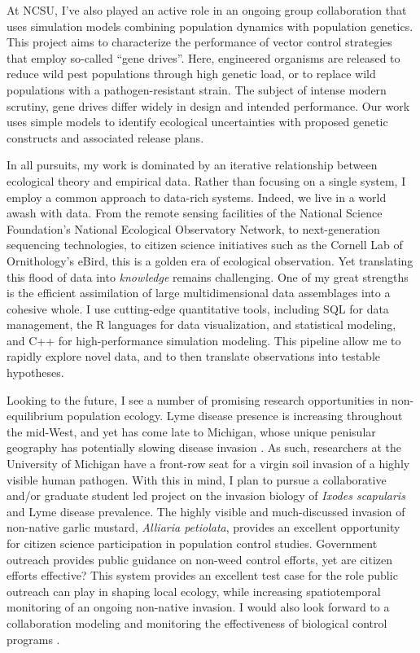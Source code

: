 \documentclass[12pt]{article}
\begin{document}
At NCSU, I've also played an active role in an ongoing group collaboration 
that uses simulation models combining population
dynamics with population genetics. This project aims to
characterize the performance of vector control strategies that employ so-called
``gene drives''.  Here, engineered organisms are released to reduce wild pest
populations through high genetic load, or to replace wild populations with a
pathogen-resistant strain.  The subject of intense modern scrutiny, gene drives
differ widely in design and intended performance.  Our work uses simple models
to identify ecological uncertainties with proposed genetic constructs and
associated release plans.


In all pursuits, my work is dominated by an iterative relationship 
between ecological theory and empirical data. Rather 
than focusing on a single system, I employ a common
approach to data-rich systems.  Indeed,
we live in a world awash with data. From the remote sensing 
facilities of the National Science Foundation's National 
Ecological Observatory Network, to next-generation 
sequencing technologies, to citizen science initiatives 
such as the Cornell Lab of Ornithology's eBird,
this is a golden era of ecological observation. 
Yet translating this flood of data into {\em knowledge} 
remains challenging.  One of my great strengths is the
efficient assimilation of large multidimensional data 
assemblages into a cohesive whole. 
I use cutting-edge quantitative tools, including 
SQL for data management, the R languages for data visualization,
and statistical modeling, and C++ for high-performance simulation
modeling. This pipeline allow me to rapidly explore novel data,
and to then translate observations into testable hypotheses.

Looking to the future, I see a number of promising research
opportunities in non-equilibrium population ecology. Lyme disease 
presence is increasing throughout the mid-West, and yet has come 
late to Michigan, whose unique
penisular geography has potentially slowing disease invasion \citep{hamer2010invasion}. 
As such, researchers at the University of Michigan have a front-row seat 
for a virgin soil invasion of a highly visible human pathogen.
With this in mind, I plan to pursue a collaborative and/or graduate student led
project on the invasion biology of {\em Ixodes scapularis} and Lyme disease
prevalence.  The highly visible and much-discussed invasion of non-native
garlic mustard, {\em Alliaria petiolata}, provides an excellent opportunity 
for citizen science participation in population control studies.  
Government outreach provides public guidance on non-weed control efforts, 
yet are citizen efforts effective? This system provides an excellent 
test case for the role public outreach can play in shaping local 
ecology, while increasing spatiotemporal monitoring of an ongoing non-native 
invasion. I would also look forward to a collaboration modeling and 
monitoring the effectiveness of biological control programs \citep{evans2012importance}.
\end{document}
